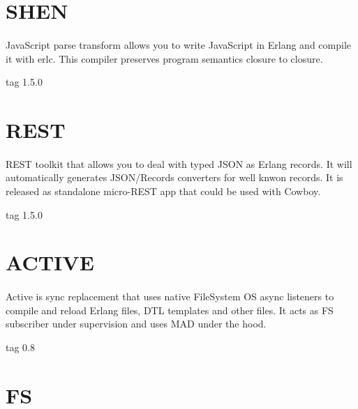 \documentclass[11pt]{article}
\begin{document}
\section*{SHEN}
\paragraph{}
JavaScript parse transform allows you to write JavaScript in Erlang and
compile it with erlc. This compiler preserves program semantics closure to closure.

 tag 1.5.0

\section*{REST}
\paragraph{}
REST toolkit that allows you to deal with typed JSON as Erlang records.
It will automatically generates JSON/Records converters for well knwon records.
It is released as standalone micro-REST app that could be used with Cowboy.

 tag 1.5.0


\section*{ACTIVE}
\paragraph{}
Active is sync replacement that uses native FileSystem OS async
listeners to compile and reload Erlang files, DTL templates and other files.
It acts as FS subscriber under supervision and uses MAD under the hood.

 tag 0.8

\section*{FS}
\end{document}
